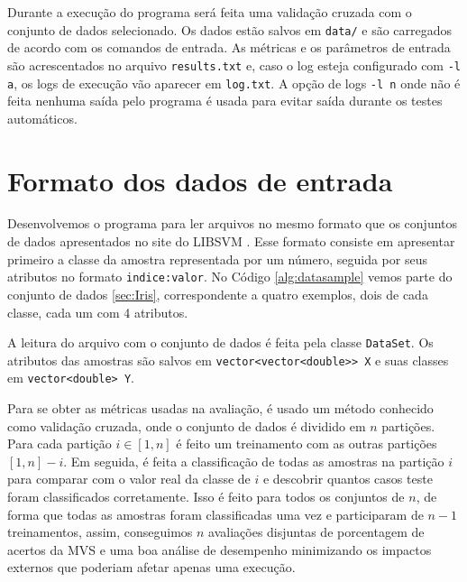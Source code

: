 Durante a execução do programa será feita uma validação cruzada com o conjunto de dados selecionado. Os dados estão salvos em \texttt{data/} e são carregados de acordo com os comandos de entrada. As métricas e os parâmetros de entrada são acrescentados no arquivo \texttt{results.txt} e, caso o log esteja configurado com \texttt{-l a}, os logs de execução vão aparecer em \texttt{log.txt}. A opção de logs \texttt{-l n} onde não é feita nenhuma saída pelo programa é usada para evitar saída durante os testes automáticos.

\section{Formato dos dados de entrada}
Desenvolvemos o programa para ler arquivos no mesmo formato que os conjuntos de dados apresentados no site do LIBSVM \cite{art:LIBSVM}. Esse formato consiste em apresentar primeiro a classe da amostra representada por um número, seguida por seus atributos no formato \texttt{indice:valor}. No Código \ref{alg:datasample} vemos parte do conjunto de dados \ref{sec:Iris}, correspondente a quatro exemplos, dois de cada classe, cada um com 4 atributos.


A leitura do arquivo com o conjunto de dados é feita pela classe \texttt{DataSet}. Os atributos das amostras são salvos em \texttt{vector<vector<double>> X} e suas classes em \texttt{vector<double> Y}.


Para se obter as métricas usadas na avaliação, é usado um método conhecido como validação cruzada, onde o conjunto de dados é dividido em $n$ partições. Para cada partição $i \in [1,n]$ é feito um treinamento com as outras partições $[1,n]-i$. Em seguida, é feita a classificação de todas as amostras na partição $i$ para comparar com o valor real da classe de $i$ e descobrir quantos casos teste foram classificados corretamente. Isso é feito para todos os conjuntos de $n$, de forma que todas as amostras foram classificadas uma vez e participaram de $n-1$ treinamentos, assim, conseguimos $n$ avaliações disjuntas de porcentagem de acertos da MVS e uma boa análise de desempenho minimizando os impactos externos que poderiam afetar apenas uma execução.

